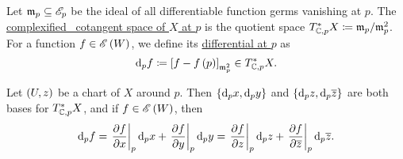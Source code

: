 \documentclass[../Moduli_Spaces_of_Riemann_Surfaces.tex]{subfiles}
\begin{document}
    \begin{definition}
        Let $\mathfrak{m}_p\subseteq\mathscr{E}_p$ be the ideal of all differentiable function germs vanishing at $p$. The \ul{complexified\ \,\,}\!\!\!\footnotemark\ul{cotangent space of $X$ at $p$} is the quotient space $T_{\mathbb{C},p}^\ast X\coloneqq\mathfrak{m}_p/\mathfrak{m}^2_p$. For a function $f\in\mathscr{E}\left(W\right)$, we define its \ul{differential at $p$} as
        \begin{equation*}
            \mathrm{d}_pf\coloneqq\left[f-f\left(p\right)\right]_{\mathfrak{m}_p^2}\in T_{\mathbb{C},p}^\ast X.
        \end{equation*}
    \end{definition}
    \begin{proposition}
        Let $\left(U,z\right)$ be a chart of $X$ around $p$. Then $\left\{\mathrm{d}_px,\mathrm{d}_py\right\}$ and $\left\{\mathrm{d}_pz,\mathrm{d}_p\overline{z}\right\}$ are both bases for $T_{\mathbb{C},p}^\ast X$, and if $f\in\mathscr{E}\left(W\right)$, then
        \begin{equation*}
            \mathrm{d}_pf=\left.\frac{\partial f}{\partial x}\right|_p\mathrm{d}_px+\left.\frac{\partial f}{\partial y}\right|_p\mathrm{d}_py=\left.\frac{\partial f}{\partial z}\right|_p\mathrm{d}_pz+\left.\frac{\partial f}{\partial\overline{z}}\right|_p\mathrm{d}_p\overline{z}.
        \end{equation*}
    \end{proposition}
\end{document}
